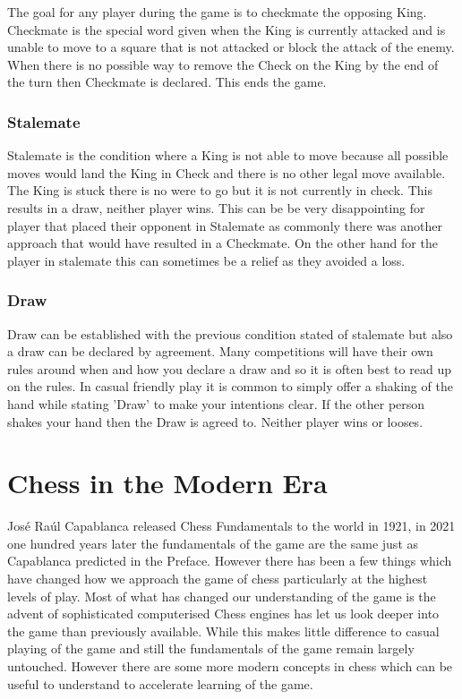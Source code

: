 \documentclass[11pt,a4paper]{book}
\begin{document}
The goal for any player during the game is to checkmate the opposing King. Checkmate is the special word given when the King is currently attacked and is unable to move to a square that is not attacked or block the attack of the enemy.
When there is no possible way to remove the Check on the King by the end of the turn then Checkmate is declared. This ends the game.
 
\subsection*{Stalemate}

Stalemate is the condition where a King is not able to move because all possible moves would land the King in Check and there is no other legal move available. The King is stuck there is no were to go but it is not currently in check. This results in a draw, neither player wins. This can be be very disappointing for player that placed their opponent in Stalemate as commonly there was another approach that would have resulted in a Checkmate. On the other hand for the player in stalemate this can sometimes be a relief as they avoided a loss.

\subsection*{Draw}

Draw can be established with the previous condition stated of stalemate but also a draw can be declared by agreement. Many competitions will have their own rules around when and how you declare a draw and so it is often best to read up on the rules. In casual friendly play it is common to simply offer a shaking of the hand while stating 'Draw' to make your intentions clear. If the other person shakes your hand then the Draw is agreed to. Neither player wins or looses.

\chapter{Chess in the Modern Era}

José Raúl Capablanca released Chess Fundamentals to the world in 1921, in 2021 one hundred years later the fundamentals of the game are the same just as Capablanca predicted in the Preface. However there has been a few things which have changed how we approach the game of chess particularly at the highest levels of play. Most of what has changed our understanding of the game is the advent of sophisticated computerised Chess engines has let us look deeper into the game than previously available. While this makes little difference to casual playing of the game and still the fundamentals of the game remain largely untouched. However there are some more modern concepts in chess which can be useful to understand to accelerate learning of the game.
\end{document}
